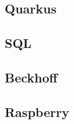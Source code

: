\begin{spacing}{1}
    \section{Quarkus}\label{section:quarkus}
    \end{spacing}


\begin{spacing}{1}
    \section{SQL}\label{section:sql}
    \end{spacing}


\begin{spacing}{1}
    \section{Beckhoff}\label{section:allTechBeckhoff}
    \end{spacing}

 
\begin{spacing}{1}
    \section{Raspberry}\label{section:allTechRaspberry}
    \end{spacing}

 

